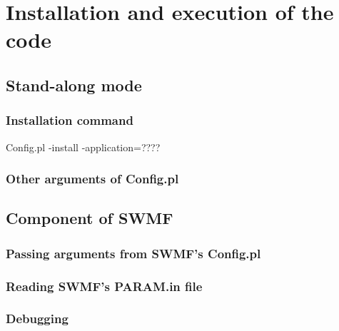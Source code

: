 \chapter{Installation and execution of the code}

\section{Stand-along mode}

\subsection {Installation command}

Config.pl -install -application=????

\subsection{Other arguments of Config.pl}



\section {Component of SWMF}
\subsection {Passing arguments from SWMF's Config.pl}
\subsection {Reading SWMF's PARAM.in file}
\subsection {Debugging}




